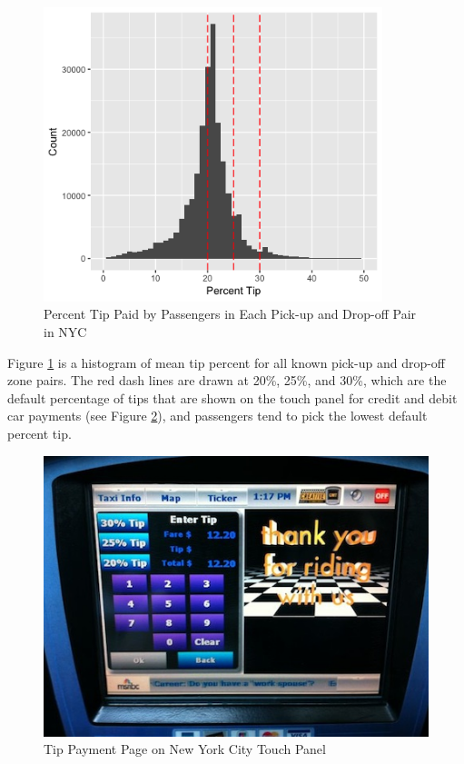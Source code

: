 \documentclass[12pt,twoside]{reedthesis}
\theoremstyle{definition}
\theoremstyle{definition}
\theoremstyle{definition}
\theoremstyle{remark}
\begin{document}
\begin{figure}[h]

{\centering \includegraphics[width=3.89in]{figure/region_vis} 

}

\caption{Percent Tip Paid by Passengers in Each Pick-up and Drop-off Pair in NYC}\label{fig:region-vis}
\end{figure}
Figure \ref{fig:region-vis} is a histogram of mean tip percent for all
known pick-up and drop-off zone pairs. The red dash lines are drawn at
20\%, 25\%, and 30\%, which are the default percentage of tips that are
shown on the touch panel for credit and debit car payments (see Figure
\ref{fig:taxi-screen}), and passengers tend to pick the lowest default
percent tip.
\begin{figure}[h]

{\centering \includegraphics[width=4.8in]{figure/taxi-screen} 

}

\caption{Tip Payment Page on New York City Touch Panel}\label{fig:taxi-screen}
\end{figure}
\end{document}
